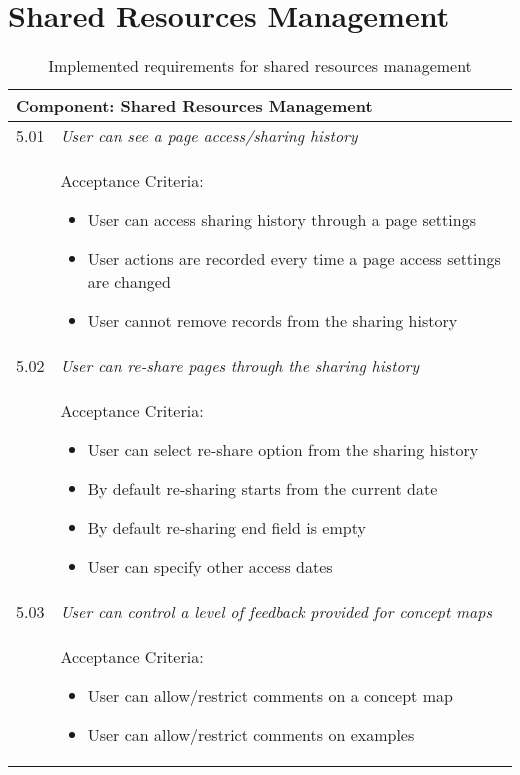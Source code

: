 \section{Shared Resources Management}

\begin{table}[htb]
\setlength{\abovecaptionskip}{0pt}
\caption{Implemented requirements for shared resources management}
\begin{center} \small
	\begin{tabular}{|l p{12cm}|}
     \hline
     \multicolumn{2}{|l|}{\textbf{Component:} Shared Resources Management} \\
     \hline
     5.01 & \textit{User can see a page access/sharing history} \\ 
	   & Acceptance Criteria:  
	     \begin{itemize}[nosep,label=--]
	        \item User can access sharing history through a page settings
	        \item User actions are recorded every time a page access settings are
	        changed
	     	\item User cannot remove records from the sharing history  
	     \end{itemize} \\ \hline
     5.02 & \textit{User can re-share pages through the sharing history}  \\ 
     	 & Acceptance Criteria:  
	       \begin{itemize}[nosep,label=--]
	         \item User can select re-share option from the sharing history
	         \item By default re-sharing starts from the current date 
	         \item By default re-sharing end field is empty
	         \item User can specify other access dates
	       \end{itemize} \\ \hline
     5.03 & \textit{User can control a level of feedback provided for concept
     maps}   \\
         & Acceptance Criteria:  
	       \begin{itemize}[nosep,label=--]
	         \item User can allow/restrict comments on a concept map
	         \item User can allow/restrict comments on examples
	       \end{itemize} \\ \hline

\end{tabular}
\end{center}
\end{table}
